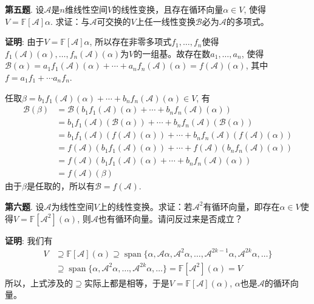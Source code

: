 \newpageorvspace


{\bf 第五题}. 设$\mathscr{A}$是$n$维线性空间$V$的线性变换，且存在循环向量$\alpha \in V$, 使得$V = \mathbb{F}[\mathscr{A}]\alpha$. 求证：与$\mathscr{A}$可交换的$V$上任一线性变换$\mathscr{B}$必为$\mathscr{A}$的多项式。


{\bf 证明}: 由于$V = \mathbb{F}[\mathscr{A}]\alpha$, 所以存在非零多项式$f_1, \ldots, f_n$使得$f_1(\mathscr{A})(\alpha), \ldots, f_n(\mathscr{A})(\alpha)$为$V$的一组基。故存在数$a_1, \ldots, a_n$, 使得$\mathscr{B}(\alpha) = a_1 f_1(\mathscr{A})(\alpha) + \cdots + a_n f_n(\mathscr{A})(\alpha) = f(\mathscr{A})(\alpha)$, 其中$f = a_1 f_1 + \cdots a_n f_n$.

任取$\beta = b_1 f_1(\mathscr{A})(\alpha) + \cdots + b_n f_n(\mathscr{A})(\alpha) \in V$, 有
\begin{align*}
\mathscr{B} (\beta) & = \mathscr{B} (b_1 f_1(\mathscr{A})(\alpha) + \cdots + b_n f_n(\mathscr{A})(\alpha)) \\
& = b_1 f_1(\mathscr{A}) (\mathscr{B}(\alpha)) + \cdots + b_n f_n(\mathscr{A})(\mathscr{B}(\alpha)) \\
& = b_1 f_1(\mathscr{A}) (f(\mathscr{A})(\alpha)) + \cdots + b_n f_n(\mathscr{A})(f(\mathscr{A})(\alpha)) \\
& = f(\mathscr{A})(b_1 f_1(\mathscr{A})(\alpha)) + \cdots + f(\mathscr{A})(b_n f_n(\mathscr{A})(\alpha)) \\
& = f(\mathscr{A}) (b_1 f_1(\mathscr{A})(\alpha) + \cdots + b_n f_n(\mathscr{A})(\alpha)) \\
& = f(\mathscr{A}) (\beta)
\end{align*}
由于$\beta$是任取的，所以有$\mathscr{B} = f(\mathscr{A})$.


\newpageorvspace


{\bf 第六题}. 设$\mathscr{A}$为线性空间$V$上的线性变换。求证：若$\mathscr{A}^2$有循环向量，即存在$\alpha\in V$使得$V = \mathbb{F}[\mathscr{A}^2](\alpha)$, 则$\mathscr{A}$也有循环向量。请问反过来是否成立？


{\bf 证明}: 我们有
\begin{align*}
V & \supseteq \mathbb{F}[\mathscr{A}](\alpha) \supseteq \operatorname{span} \{ \alpha, \mathscr{A}\alpha, \mathscr{A}^2\alpha, \ldots, \mathscr{A}^{2k-1}\alpha, \mathscr{A}^{2k}\alpha, \ldots \} \\
& \supseteq \operatorname{span} \{ \alpha, \mathscr{A}^2\alpha, \ldots, \mathscr{A}^{2k}\alpha, \ldots \} = \mathbb{F}[\mathscr{A}^2](\alpha) = V
\end{align*}
所以，上式涉及的$\supseteq$实际上都是相等，于是$V = \mathbb{F}[\mathscr{A}](\alpha)$, $\alpha$也是$\mathscr{A}$的循环向量。

